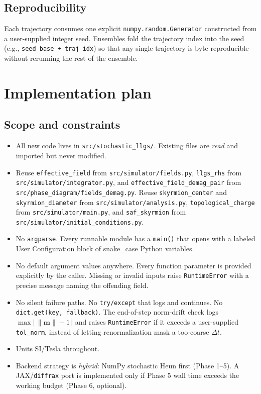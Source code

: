 \documentclass[11pt,a4paper]{article}
\newcommand{\mb}[1]{\mathbf{#1}}
\begin{document}
\subsection{Reproducibility}

Each trajectory consumes one explicit \texttt{numpy.random.Generator}
constructed from a user-supplied integer seed. Ensembles fold the
trajectory index into the seed (e.g., \texttt{seed\_base + traj\_idx})
so that any single trajectory is byte-reproducible without rerunning
the rest of the ensemble.

\section{Implementation plan}

\subsection{Scope and constraints}

\begin{itemize}[leftmargin=2em]
    \item All new code lives in \texttt{src/stochastic\_llgs/}.
    Existing files are \emph{read} and imported but never modified.
    \item Reuse \texttt{effective\_field} from
    \texttt{src/simulator/fields.py}, \texttt{llgs\_rhs} from
    \texttt{src/simulator/integrator.py}, and
    \texttt{effective\_field\_demag\_pair} from
    \texttt{src/phase\_diagram/fields\_demag.py}. Reuse
    \texttt{skyrmion\_center} and \texttt{skyrmion\_diameter} from
    \texttt{src/simulator/analysis.py}, \texttt{topological\_charge}
    from \texttt{src/simulator/main.py}, and \texttt{saf\_skyrmion}
    from \texttt{src/simulator/initial\_conditions.py}.
    \item No \texttt{argparse}. Every runnable module has a
    \texttt{main()} that opens with a labeled User Configuration
    block of snake\_case Python variables.
    \item No default argument values anywhere. Every function
    parameter is provided explicitly by the caller. Missing or
    invalid inputs raise \texttt{RuntimeError} with a precise message
    naming the offending field.
    \item No silent failure paths. No \texttt{try/except} that logs
    and continues. No \texttt{dict.get(key, fallback)}. The
    end-of-step norm-drift check logs
    $\max\big|\,\|\mb{m}\| - 1\,\big|$ and raises
    \texttt{RuntimeError} if it exceeds a user-supplied
    \texttt{tol\_norm}, instead of letting renormalization mask a
    too-coarse $\Delta t$.
    \item Units SI/Tesla throughout.
    \item Backend strategy is \emph{hybrid}: NumPy stochastic Heun
    first (Phase 1--5). A JAX/\texttt{diffrax} port is implemented
    only if Phase 5 wall time exceeds the working budget (Phase 6,
    optional).
\end{itemize}
\end{document}
